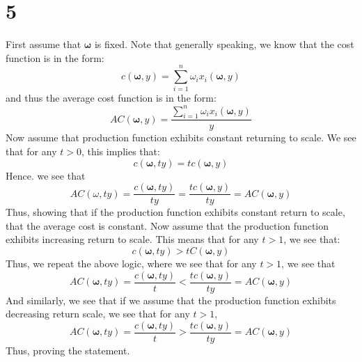 \documentclass[11pt]{article}
\begin{document}
\section*{5}
First assume that $\mathbf{\omega}$ is fixed. Note that generally speaking, we know that the cost function is in the form:
\[
c(\mathbf{\omega}, y) = \sum_{i=1}^n \omega_i x_i(\mathbf{\omega}, y) 
\]
and thus the average cost function is in the form:
\[
AC(\mathbf{\omega}, y) = \frac{\sum_{i = 1}^n \omega_i x_i(\mathbf{\omega}, y)}{y}
\]
Now assume that production function exhibits constant returning to scale. We see that for any $t > 0$, this implies that:
\[
c(\mathbf{\omega}, ty) = tc(\mathbf{\omega}, y)
\]
Hence. we see that 
\[
AC(\omega, ty) = \frac{c(\mathbf{\omega}, ty)}{ty} = \frac{tc(\mathbf{\omega}, y)}{ty} = AC(\mathbf{\omega}, y) 
\]
Thus, showing that if the production function exhibits constant return to scale, that the average cost is constant. Now assume that the production function exhibits increasing return to scale. This means that for any $t > 1$, we see that:
\[
c(\mathbf{\omega}, ty) > tC(\mathbf{\omega}, y) 
\]
Thus, we repeat the above logic, where we see that for any $t> 1$, we see that 
\[
AC(\mathbf{\omega}, ty) = \frac{c(\mathbf{\omega}, ty)}{t} < \frac{tc(\mathbf{\omega}, y)}{ty} = AC(\mathbf{\omega}, y)
\]
And similarly, we see that if we assume that the production function exhibits decreasing return scale, we see that for any $t > 1$, 
\[
AC(\mathbf{\omega}, ty) = \frac{c(\mathbf{\omega}, ty)}{t} > \frac{tc(\mathbf{\omega}, y)}{ty} = AC(\mathbf{\omega}, y)
\]
Thus, proving the statement. 
\end{document}

